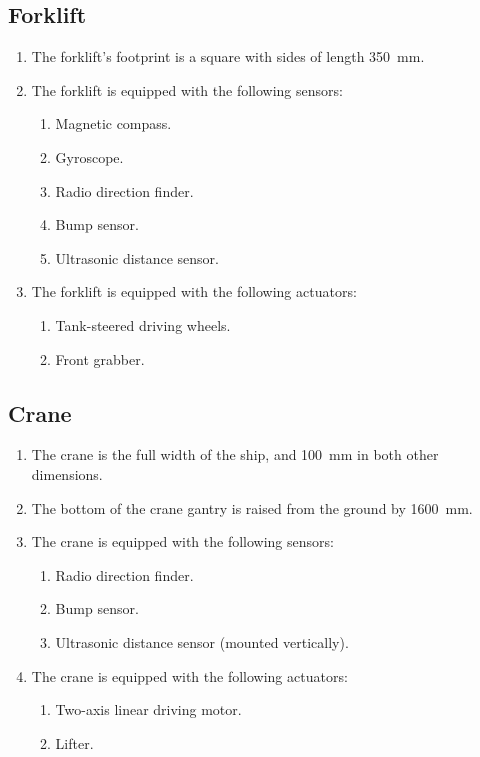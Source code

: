 \subsection{Forklift}
\label{spec:forklift}

\begin{enumerate}
  \item The forklift's footprint is a square with sides of length \SI{350}{mm}.
  \item The forklift is equipped with the following sensors:
  \begin{enumerate}
    \item Magnetic compass.
    \item Gyroscope.
    \item Radio direction finder.
    \item Bump sensor.
    \item Ultrasonic distance sensor.
  \end{enumerate}
  \item The forklift is equipped with the following actuators:
  \begin{enumerate}
    \item Tank-steered driving wheels.
    \item Front grabber.
  \end{enumerate}
\end{enumerate}

\subsection{Crane}
\label{spec:crane}

\begin{enumerate}
  \item The crane is the full width of the ship, and \SI{100}{mm}
        in both other dimensions.
  \item The bottom of the crane gantry is raised from the ground by
        \SI{1600}{mm}.
  \item The crane is equipped with the following sensors:
  \begin{enumerate}
    \item Radio direction finder.
    \item Bump sensor.
    \item Ultrasonic distance sensor (mounted vertically).
  \end{enumerate}
  \item The crane is equipped with the following actuators:
  \begin{enumerate}
    \item Two-axis linear driving motor.
    \item Lifter.
  \end{enumerate}
\end{enumerate}
